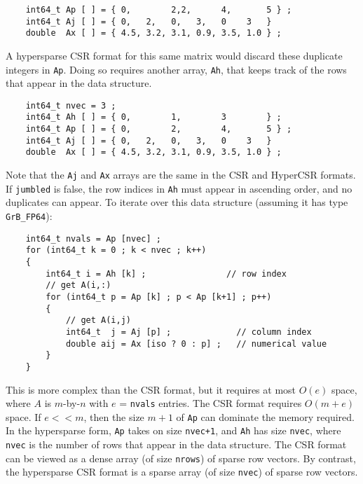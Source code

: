 \documentclass[12pt]{article}
\begin{document}
{{\footnotesize
\begin{verbatim}
    int64_t Ap [ ] = { 0,        2,2,      4,       5 } ;
    int64_t Aj [ ] = { 0,   2,   0,   3,   0    3   }
    double  Ax [ ] = { 4.5, 3.2, 3.1, 0.9, 3.5, 1.0 } ; \end{verbatim} }

A hypersparse CSR format for this same matrix would discard
these duplicate integers in \verb'Ap'.  Doing so requires
another array, \verb'Ah', that keeps track of the rows that appear
in the data structure.

{\footnotesize
\begin{verbatim}
    int64_t nvec = 3 ;
    int64_t Ah [ ] = { 0,        1,        3        } ;
    int64_t Ap [ ] = { 0,        2,        4,       5 } ;
    int64_t Aj [ ] = { 0,   2,   0,   3,   0    3   }
    double  Ax [ ] = { 4.5, 3.2, 3.1, 0.9, 3.5, 1.0 } ; \end{verbatim} }

Note that the \verb'Aj' and \verb'Ax' arrays are the same in the CSR and
HyperCSR formats.  If \verb'jumbled' is false, the row indices in \verb'Ah'
must appear in ascending order, and no duplicates can appear.  To iterate over
this data structure (assuming it has type \verb'GrB_FP64'):

    {\footnotesize
    \begin{verbatim}
    int64_t nvals = Ap [nvec] ;
    for (int64_t k = 0 ; k < nvec ; k++)
    {
        int64_t i = Ah [k] ;                // row index
        // get A(i,:)
        for (int64_t p = Ap [k] ; p < Ap [k+1] ; p++)
        {
            // get A(i,j)
            int64_t  j = Aj [p] ;             // column index
            double aij = Ax [iso ? 0 : p] ;   // numerical value
        }
    } \end{verbatim}}

\vspace{-0.05in}
This is more complex than the CSR format, but it requires at most
$O(e)$ space, where $A$ is $m$-by-$n$ with $e$ = \verb'nvals' entries.  The
CSR format requires $O(m+e)$ space.  If $e << m$, then the size $m+1$
of \verb'Ap' can dominate the memory required.  In the hypersparse form,
\verb'Ap' takes on size \verb'nvec+1', and \verb'Ah' has size \verb'nvec',
where \verb'nvec' is the number of rows that appear in the data structure.
The CSR format can be viewed as a dense array (of size \verb'nrows')
of sparse row vectors.   By contrast, the hypersparse CSR format is a sparse
array (of size \verb'nvec') of sparse row vectors.

}
\end{document}
